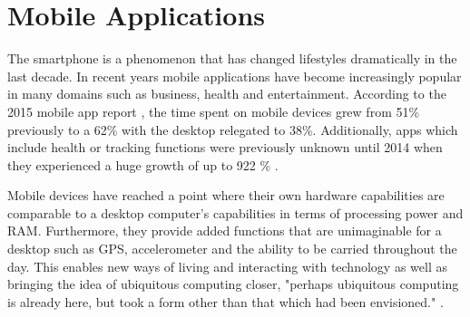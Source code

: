 \section{Mobile Applications}
The smartphone is a phenomenon that has changed lifestyles dramatically in the last decade. In recent years mobile applications have become increasingly popular in many domains such as business, health and entertainment. According to the 2015 mobile app report \cite{ComScore}, the time spent on mobile devices grew from 51\% previously to a 62\% with the desktop relegated to 38\%. Additionally, apps which include health or tracking functions were previously unknown until 2014 when they experienced a huge growth of up to 922 \% \cite{ComScore}. 

Mobile devices have reached a point where their own hardware capabilities are comparable to a desktop computer's capabilities in terms of processing power and RAM. Furthermore, they provide added functions that are unimaginable for a desktop such as GPS, accelerometer and the ability to be carried throughout the day. This enables new ways of living and interacting with technology as well as bringing the idea of ubiquitous computing closer, "perhaps ubiquitous computing is already here, but took a form other than that which had been envisioned." \cite{Bell2007}. 

